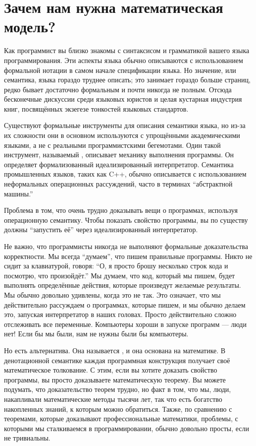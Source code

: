 \section{Зачем нам нужна математическая модель?}

Как программист вы близко знакомы с синтаксисом и грамматикой
вашего языка программирования. Эти аспекты языка обычно
описываются с использованием формальной нотации в самом начале спецификации языка.
Но значение, или семантика, языка гораздо труднее
описать; это занимает гораздо больше страниц, редко бывает достаточно формальным и почти
никогда не полным. Отсюда бесконечные дискуссии среди языковых
юристов и целая кустарная индустрия книг, посвящённых экзегезе
тонкостей языковых стандартов.

Существуют формальные инструменты для описания семантики языка, но
из-за их сложности они в основном используются с упрощёнными
академическими языками, а не с реальными программистскими бегемотами. Один такой инструмент,
называемый , описывает механику выполнения программы.
Он определяет формализованный идеализированный интерпретатор. Семантика
промышленных языков, таких как C++, обычно описывается с использованием
неформальных операционных рассуждений, часто в терминах ``абстрактной
машины.''

Проблема в том, что очень трудно доказывать вещи о программах, используя
операционную семантику. Чтобы показать свойство программы, вы по существу
должны ``запустить её'' через идеализированный интерпретатор.

Не важно, что программисты никогда не выполняют формальные доказательства
корректности. Мы всегда ``думаем'', что пишем правильные программы. Никто
не сидит за клавиатурой, говоря: ``О, я просто брошу несколько строк кода
и посмотрю, что произойдёт.'' Мы думаем, что код, который мы пишем, будет выполнять
определённые действия, которые произведут желаемые результаты. Мы обычно довольно
удивлены, когда это не так. Это означает, что мы действительно рассуждаем о программах, которые
пишем, и мы обычно делаем это, запуская интерпретатор в наших головах. Просто
действительно сложно отслеживать все переменные. Компьютеры хороши
в запуске программ --- люди нет! Если бы мы были, нам не нужны были бы
компьютеры.

Но есть альтернатива. Она называется ,
и она основана на математике. В денотационной семантике каждая программная
конструкция получает своё математическое толкование. С этим, если вы
хотите доказать свойство программы, вы просто доказываете математическую
теорему. Вы можете подумать, что доказательство теорем трудно, но факт в том,
что мы, люди, накапливали математические методы тысячи
лет, так что есть богатство накопленных знаний, к которым можно обратиться.
Также, по сравнению с теоремами, которые доказывают профессиональные
математики, проблемы, с которыми мы сталкиваемся в программировании,
обычно довольно просты, если не тривиальны.

